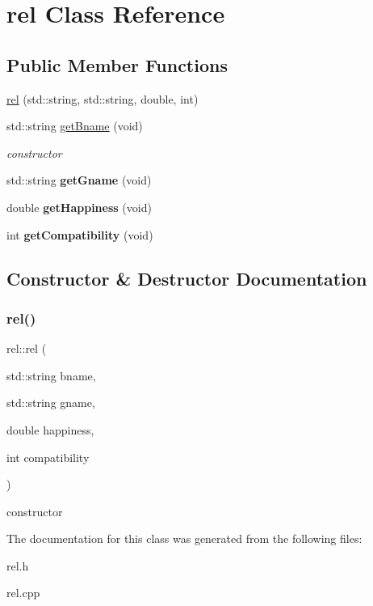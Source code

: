 \hypertarget{classrel}{}\section{rel Class Reference}
\label{classrel}
\subsection*{Public Member Functions}
\begin{DoxyCompactItemize}
\item 
\hyperlink{classrel_a8f18236fd22ac8c3bd4455315c2acd89}{rel} (std\+::string, std\+::string, double, int)
\item 
\mbox{\label{classrel_a1bb74d090c50469946d0eb1ccd9ab520}} 
std\+::string \hyperlink{classrel_a1bb74d090c50469946d0eb1ccd9ab520}{get\+Bname} (void)
\begin{DoxyCompactList}\small\item\em constructor \end{DoxyCompactList}\item 
\mbox{\label{classrel_a250562cd452083afa84a0d5e02d7c1a6}} 
std\+::string {\bfseries get\+Gname} (void)
\item 
\mbox{\label{classrel_af5bb5fbc139defc9433ace4f829124b0}} 
double {\bfseries get\+Happiness} (void)
\item 
\mbox{\label{classrel_aebf12c2915c3231f23e4559b99c47a73}} 
int {\bfseries get\+Compatibility} (void)
\end{DoxyCompactItemize}


\subsection{Constructor \& Destructor Documentation}
\mbox{\label{classrel_a8f18236fd22ac8c3bd4455315c2acd89}} 
\subsubsection{\texorpdfstring{rel()}{rel()}}
{\footnotesize\ttfamily rel\+::rel (\begin{DoxyParamCaption}\item[{std\+::string}]{bname,  }\item[{std\+::string}]{gname,  }\item[{double}]{happiness,  }\item[{int}]{compatibility }\end{DoxyParamCaption})}

constructor 

The documentation for this class was generated from the following files\+:\begin{DoxyCompactItemize}
\item 
rel.\+h\item 
rel.\+cpp\end{DoxyCompactItemize}
